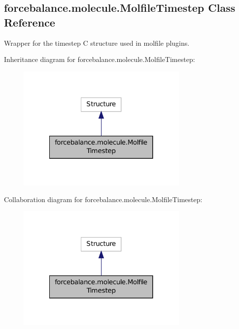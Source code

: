 \hypertarget{classforcebalance_1_1molecule_1_1MolfileTimestep}{\subsection{forcebalance.\-molecule.\-Molfile\-Timestep Class Reference}
\label{classforcebalance_1_1molecule_1_1MolfileTimestep}
}


Wrapper for the timestep C structure used in molfile plugins.  




Inheritance diagram for forcebalance.\-molecule.\-Molfile\-Timestep\-:\nopagebreak
\begin{figure}[H]
\begin{center}
\leavevmode
\includegraphics[width=236pt]{classforcebalance_1_1molecule_1_1MolfileTimestep__inherit__graph}
\end{center}
\end{figure}


Collaboration diagram for forcebalance.\-molecule.\-Molfile\-Timestep\-:\nopagebreak
\begin{figure}[H]
\begin{center}
\leavevmode
\includegraphics[width=236pt]{classforcebalance_1_1molecule_1_1MolfileTimestep__coll__graph}
\end{center}
\end{figure}


